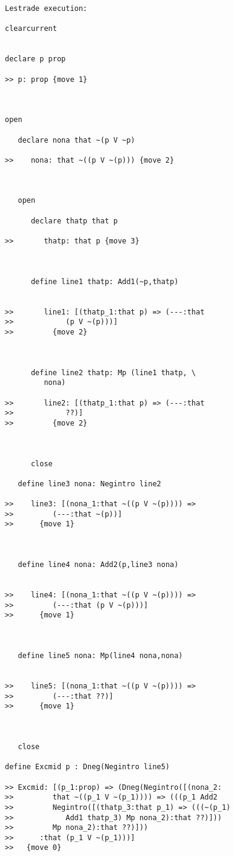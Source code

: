 \documentclass[12pt]{article}
\begin{document}
\begin{verbatim}Lestrade execution:

clearcurrent


declare p prop

>> p: prop {move 1}



open

   declare nona that ~(p V ~p)

>>    nona: that ~((p V ~(p))) {move 2}



   open

      declare thatp that p

>>       thatp: that p {move 3}



      define line1 thatp: Add1(~p,thatp)


>>       line1: [(thatp_1:that p) => (---:that
>>            (p V ~(p)))]
>>         {move 2}



      define line2 thatp: Mp (line1 thatp, \
         nona)

>>       line2: [(thatp_1:that p) => (---:that
>>            ??)]
>>         {move 2}



      close

   define line3 nona: Negintro line2

>>    line3: [(nona_1:that ~((p V ~(p)))) =>
>>         (---:that ~(p))]
>>      {move 1}



   define line4 nona: Add2(p,line3 nona)


>>    line4: [(nona_1:that ~((p V ~(p)))) =>
>>         (---:that (p V ~(p)))]
>>      {move 1}



   define line5 nona: Mp(line4 nona,nona)


>>    line5: [(nona_1:that ~((p V ~(p)))) =>
>>         (---:that ??)]
>>      {move 1}



   close

define Excmid p : Dneg(Negintro line5)

>> Excmid: [(p_1:prop) => (Dneg(Negintro([(nona_2:
>>         that ~((p_1 V ~(p_1)))) => (((p_1 Add2
>>         Negintro([(thatp_3:that p_1) => (((~(p_1)
>>            Add1 thatp_3) Mp nona_2):that ??)]))
>>         Mp nona_2):that ??)]))
>>      :that (p_1 V ~(p_1)))]
>>   {move 0}


\end{verbatim}
\end{document}
